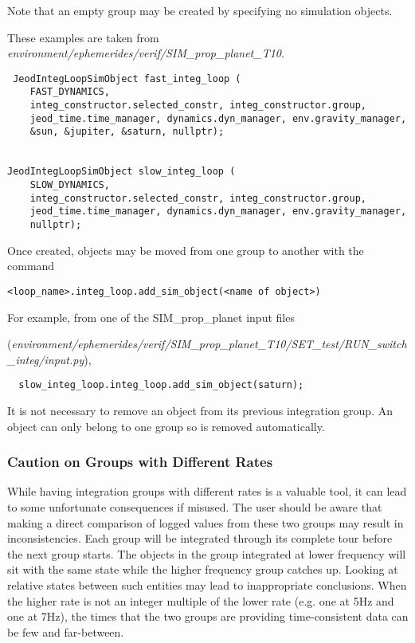 Note that an empty group may be created by specifying no simulation objects.

These examples are taken from
\textit{environment/ephemerides/verif/SIM\_prop\_planet\_T10}.
\begin{verbatim}
 JeodIntegLoopSimObject fast_integ_loop (
    FAST_DYNAMICS,
    integ_constructor.selected_constr, integ_constructor.group,
    jeod_time.time_manager, dynamics.dyn_manager, env.gravity_manager,
    &sun, &jupiter, &saturn, nullptr);


JeodIntegLoopSimObject slow_integ_loop (
    SLOW_DYNAMICS,
    integ_constructor.selected_constr, integ_constructor.group,
    jeod_time.time_manager, dynamics.dyn_manager, env.gravity_manager,
    nullptr);
\end{verbatim}


Once created, objects may be moved from one group to another with the command
\begin{verbatim}
<loop_name>.integ_loop.add_sim_object(<name of object>)
\end{verbatim}

For example, from one of the SIM\_prop\_planet input files

(\textit{environment/ephemerides/verif/SIM\_prop\_planet\_T10/SET\_test/RUN\_switch\_integ/input.py}),
\begin{verbatim}
  slow_integ_loop.integ_loop.add_sim_object(saturn);
\end{verbatim}
It is not necessary to remove an object from its previous integration group.
An object can only belong to one group so is removed automatically.


\subsubsection{Caution on Groups with Different Rates}
While having integration groups with different rates is a valuable tool, it
can
lead to some unfortunate consequences if misused.  The user should be aware
that making a direct comparison of logged values from these two groups may
result in inconsistencies.  Each group will be integrated through its complete
tour before the next group starts.  The objects in the group integrated at
lower frequency will sit with the same state while the higher frequency group
catches up.  Looking at relative states between such entities may lead to
inappropriate conclusions.  When the higher rate is not an integer multiple of
the lower rate (e.g. one at 5Hz and one at 7Hz), the times that the two groups
are providing time-consistent data can be few and far-between.

